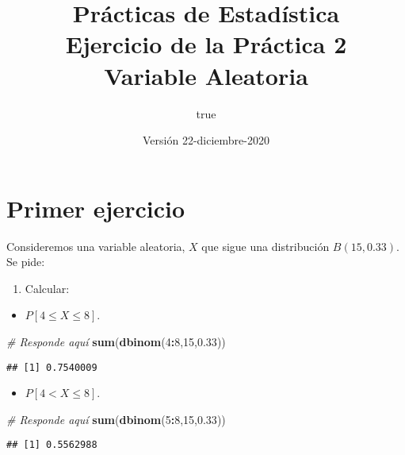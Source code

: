 \documentclass[
]{article}
\title{Prácticas de Estadística\\
Ejercicio de la Práctica 2\\
Variable Aleatoria}
\author{true}
\date{Versión 22-diciembre-2020}
\newenvironment{Shaded}{\begin{snugshade}}{\end{snugshade}}
\newcommand{\CommentTok}[1]{\textcolor[rgb]{0.56,0.35,0.01}{\textit{#1}}}
\newcommand{\DecValTok}[1]{\textcolor[rgb]{0.00,0.00,0.81}{#1}}
\newcommand{\FloatTok}[1]{\textcolor[rgb]{0.00,0.00,0.81}{#1}}
\newcommand{\KeywordTok}[1]{\textcolor[rgb]{0.13,0.29,0.53}{\textbf{#1}}}
\newcommand{\NormalTok}[1]{#1}
\newcommand{\OperatorTok}[1]{\textcolor[rgb]{0.81,0.36,0.00}{\textbf{#1}}}
\providecommand{\tightlist}{%
  \setlength{\itemsep}{0pt}\setlength{\parskip}{0pt}}
\begin{document}
\maketitle

{
\setcounter{tocdepth}{2}
\tableofcontents
}
\hypertarget{primer-ejercicio}{%
\section{Primer ejercicio}\label{primer-ejercicio}}

Consideremos una variable aleatoria, \(X\) que sigue una distribución
\(B(15, 0.33)\). Se pide:

\begin{enumerate}
\def\labelenumi{\arabic{enumi}.}
\tightlist
\item
  Calcular:
\end{enumerate}

\begin{itemize}
\tightlist
\item
  \(P[4\leq X \leq 8]\).
\end{itemize}

\begin{Shaded}
\begin{Highlighting}[]
\CommentTok{# Responde aquí}
\KeywordTok{sum}\NormalTok{(}\KeywordTok{dbinom}\NormalTok{(}\DecValTok{4}\OperatorTok{:}\DecValTok{8}\NormalTok{,}\DecValTok{15}\NormalTok{,}\FloatTok{0.33}\NormalTok{))}
\end{Highlighting}
\end{Shaded}

\begin{verbatim}
## [1] 0.7540009
\end{verbatim}

\begin{itemize}
\tightlist
\item
  \(P[4 < X \leq 8]\).
\end{itemize}

\begin{Shaded}
\begin{Highlighting}[]
\CommentTok{# Responde aquí}
\KeywordTok{sum}\NormalTok{(}\KeywordTok{dbinom}\NormalTok{(}\DecValTok{5}\OperatorTok{:}\DecValTok{8}\NormalTok{,}\DecValTok{15}\NormalTok{,}\FloatTok{0.33}\NormalTok{))}
\end{Highlighting}
\end{Shaded}

\begin{verbatim}
## [1] 0.5562988
\end{verbatim}
\end{document}
